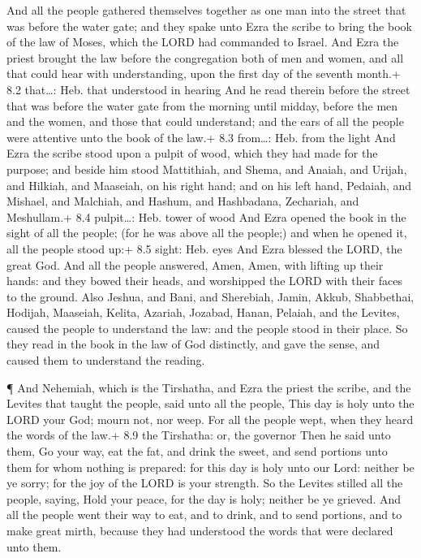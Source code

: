  And all the people gathered themselves together as one man
into the street that was before the water gate; and they spake unto Ezra
the scribe to bring the book of the law of Moses, which the LORD had
commanded to Israel.  And Ezra the priest brought the law
before the congregation both of men and women, and all that could hear
with understanding, upon the first day of the seventh month.+ 8.2
that\ldots: Heb. that understood in hearing  And he read
therein before the street that was before the water gate from the
morning until midday, before the men and the women, and those that could
understand; and the ears of all the people were attentive unto the book
of the law.+ 8.3 from\ldots: Heb. from the light  And Ezra
the scribe stood upon a pulpit of wood, which they had made for the
purpose; and beside him stood Mattithiah, and Shema, and Anaiah, and
Urijah, and Hilkiah, and Maaseiah, on his right hand; and on his left
hand, Pedaiah, and Mishael, and Malchiah, and Hashum, and Hashbadana,
Zechariah, and Meshullam.+ 8.4 pulpit\ldots: Heb. tower of wood
 And Ezra opened the book in the sight of all the people;
(for he was above all the people;) and when he opened it, all the people
stood up:+ 8.5 sight: Heb. eyes  And Ezra blessed the LORD,
the great God. And all the people answered, Amen, Amen, with lifting up
their hands: and they bowed their heads, and worshipped the LORD with
their faces to the ground.  Also Jeshua, and Bani, and
Sherebiah, Jamin, Akkub, Shabbethai, Hodijah, Maaseiah, Kelita, Azariah,
Jozabad, Hanan, Pelaiah, and the Levites, caused the people to
understand the law: and the people stood in their place.  So
they read in the book in the law of God distinctly, and gave the sense,
and caused them to understand the reading.

 ¶ And Nehemiah, which is the Tirshatha, and Ezra the priest
the scribe, and the Levites that taught the people, said unto all the
people, This day is holy unto the LORD your God; mourn not, nor weep.
For all the people wept, when they heard the words of the law.+ 8.9 the
Tirshatha: or, the governor  Then he said unto them, Go
your way, eat the fat, and drink the sweet, and send portions unto them
for whom nothing is prepared: for this day is holy unto our Lord:
neither be ye sorry; for the joy of the LORD is your strength.
 So the Levites stilled all the people, saying, Hold your
peace, for the day is holy; neither be ye grieved.  And all
the people went their way to eat, and to drink, and to send portions,
and to make great mirth, because they had understood the words that were
declared unto them.

